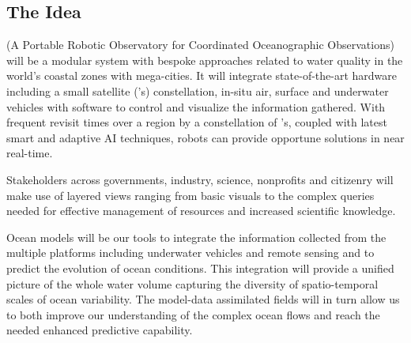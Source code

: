 \documentclass[12pt]{article}
\begin{document}
\subsection{The Idea}

\pro (A Portable Robotic Observatory for Coordinated Oceanographic
Observations) will be a modular system with bespoke approaches related
to water quality in the world's coastal zones with mega-cities. It
will integrate state-of-the-art hardware including a small satellite
(\smle's) constellation, in-situ air, surface and underwater vehicles
with software to control and visualize the information gathered. With
frequent revisit times over a region by a constellation of \smle's,
coupled with latest smart and adaptive AI techniques, robots can
provide opportune solutions in near real-time. 




Stakeholders across governments, industry, science, nonprofits and
citizenry will make use of layered views ranging from basic visuals to
the complex queries needed for effective management of resources and
increased scientific knowledge.


Ocean models will be our tools to integrate the information collected from the multiple platforms including underwater vehicles and remote sensing and to predict the evolution of ocean conditions. This integration will provide a unified picture of the whole water volume capturing the diversity of spatio-temporal scales of ocean variability. The model-data assimilated fields will in turn allow us to both improve our understanding of the complex ocean flows and reach the needed enhanced predictive capability.  
\end{document}
